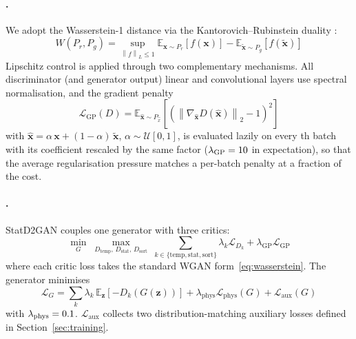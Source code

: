 \documentclass[preprint,12pt]{elsarticle}
\makeatletter
\let\ElsParagraph\paragraph
\def\StripRunInStop#1.\StripRunInMark#2\StripRunInEnd{#1}
\let\StripRunInMark\@empty
\renewcommand\paragraph[1]{\ElsParagraph{\StripRunInStop#1\StripRunInMark.\StripRunInMark\StripRunInEnd}}
\newcommand{\E}{\mathbb{E}}
\newcommand{\Preal}{P_r}
\newcommand{\Pg}{P_g}
\newcommand{\Lc}{\mathcal{L}}
\newcommand{\norm}[1]{\left\| #1 \right\|}
\newcommand{\Dtemp}{D_{\mathrm{temp}}}
\newcommand{\Dstat}{D_{\mathrm{stat}}}
\newcommand{\Dsort}{D_{\mathrm{sort}}}
\makeatother
\begin{document}
\paragraph{WGAN-GP Foundation.}
We adopt the Wasserstein-1 distance
\cite{arjovsky2017wasserstein} via the Kantorovich--Rubinstein duality
\cite{villani2009optimal}:
\begin{equation}
  W(\Preal, \Pg)
    = \sup_{\norm{f}_L \leq 1}
      \E_{\mathbf{x}\sim\Preal}\!\left[f(\mathbf{x})\right]
      - \E_{\tilde{\mathbf{x}}\sim\Pg}\!\left[f(\tilde{\mathbf{x}})\right]
  \label{eq:wasserstein}
\end{equation}
Lipschitz control is applied through two complementary mechanisms.  All
discriminator (and generator output) linear and convolutional layers use
spectral normalisation, and the gradient penalty
\cite{gulrajani2017improved}
\begin{equation}
  \Lc_{\mathrm{GP}}(D)
    = \E_{\hat{\mathbf{x}}\sim P_{\hat{x}}}\!
      \left[\left(
        \norm{\nabla_{\hat{\mathbf{x}}} D(\hat{\mathbf{x}})}_2 - 1
      \right)^{\!2}\right]
  \label{eq:gp}
\end{equation}
with $\hat{\mathbf{x}} = \alpha\,\mathbf{x} + (1-\alpha)\,\tilde{\mathbf{x}}$,
$\alpha \sim \mathcal{U}[0,1]$, is evaluated lazily on every \protoGpFreq{}th batch
with its coefficient rescaled by the same factor
($\lambda_{\mathrm{GP}} = 10$ in expectation), so that the
average regularisation pressure matches a per-batch penalty at a
fraction of the cost.

\paragraph{Objective.}
StatD2GAN couples one generator with three critics:
\begin{equation}
  \min_G \; \max_{\Dtemp,\,\Dstat,\,\Dsort} \;
    \sum_{k \in \{\mathrm{temp},\mathrm{stat},\mathrm{sort}\}}
      \lambda_k \Lc_{D_k}
    + \lambda_{\mathrm{GP}} \Lc_{\mathrm{GP}}
  \label{eq:main_obj}
\end{equation}
where each critic loss takes the standard WGAN form~\eqref{eq:wasserstein}.
The generator minimises
\begin{equation}
  \Lc_G
    = \sum_k \lambda_k\,
      \E_\mathbf{z}\!\left[-D_k(G(\mathbf{z}))\right]
    + \lambda_{\mathrm{phys}} \Lc_{\mathrm{phys}}(G)
    + \Lc_{\mathrm{aux}}(G)
  \label{eq:gen_loss}
\end{equation}
with $\lambda_{\mathrm{phys}} = 0.1$.
$\Lc_{\mathrm{aux}}$ collects two distribution-matching auxiliary losses
defined in Section~\ref{sec:training}.
\end{document}
